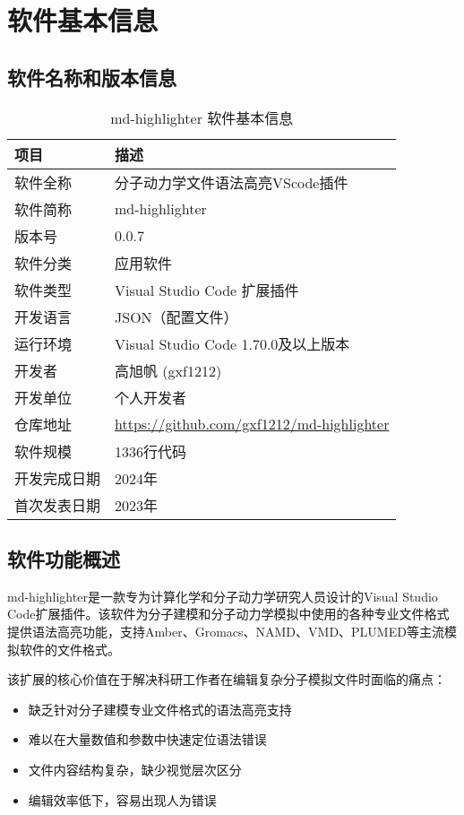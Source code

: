 
\section{软件基本信息}

\subsection{软件名称和版本信息}

\begin{table}[h]
\centering
\caption{md-highlighter 软件基本信息}
\begin{tabular}{p{3cm}p{10cm}}
\toprule
\textbf{项目} & \textbf{描述} \\
\midrule
软件全称 & 分子动力学文件语法高亮VScode插件 \\
软件简称 & md-highlighter \\
版本号 & 0.0.7 \\
软件分类 & 应用软件 \\
软件类型 & Visual Studio Code 扩展插件 \\
开发语言 & JSON（配置文件）\\
运行环境 & Visual Studio Code 1.70.0及以上版本 \\
开发者 & 高旭帆 (gxf1212) \\
开发单位 & 个人开发者 \\
仓库地址 & \href{https://github.com/gxf1212/md-highlighter}{https://github.com/gxf1212/md-highlighter} \\
软件规模 & 1336行代码 \\
开发完成日期 & 2024年 \\
首次发表日期 & 2023年 \\
\bottomrule
\end{tabular}
\end{table}

\subsection{软件功能概述}

md-highlighter是一款专为计算化学和分子动力学研究人员设计的Visual Studio Code扩展插件。该软件为分子建模和分子动力学模拟中使用的各种专业文件格式提供语法高亮功能，支持Amber、Gromacs、NAMD、VMD、PLUMED等主流模拟软件的文件格式。

该扩展的核心价值在于解决科研工作者在编辑复杂分子模拟文件时面临的痛点：
\begin{itemize}
    \item 缺乏针对分子建模专业文件格式的语法高亮支持
    \item 难以在大量数值和参数中快速定位语法错误
    \item 文件内容结构复杂，缺少视觉层次区分
    \item 编辑效率低下，容易出现人为错误
\end{itemize}

